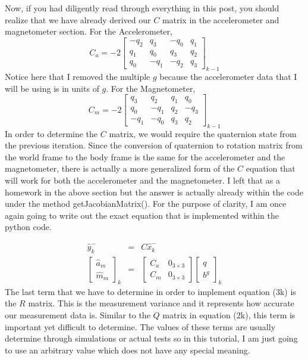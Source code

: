 \documentclass[a4paper,12pt]{book}
\begin{document}
Now, if you had diligently read through everything in this post, you should realize that we have already derived our $C$ matrix in the accelerometer and magnetometer section. For the Accelerometer,
\begin{equation}
    C_a= -2\begin{bmatrix} -q_2 & q_3 & -q_0 & q_1 \\ q_1 & q_0 & q_3 & q_2 \\ q_0 & -q_1 & -q_2 & q_3 \end{bmatrix}_{k-1}
\end{equation}
Notice here that I removed the multiple $g$ because the accelerometer data that I will be using is in units of $g$. For the Magnetometer,
\begin{equation}
    C_m= -2\begin{bmatrix} q_3 & q_2 & q_1 & q_0 \\ q_0 & -q_1 & q_2 & -q_3 \\ -q_1 & -q_0 & q_3 & q_2 \end{bmatrix}_{k-1}
\end{equation}
In order to determine the $C$ matrix, we would require the quaternion state from the previous iteration. Since the conversion of quaternion to rotation matrix from the world frame to the body frame is the same for the accelerometer and the magnetometer, there is actually a more generalized form of the $C$ equation that will work for both the accelerometer and the magnetometer. I left that as a homework in the above section but the answer is actually already within the code under the method getJacobianMatrix(). For the purpose of clarity, I am once again going to write out the exact equation that is implemented within the python code.

\begin{eqnarray}
    \hat{y}^-_k &=& C\hat{x}^-_k \\ 
    \begin{bmatrix} \hat{a}_m \\ \hat{m}_m \end{bmatrix}_k &=& \begin{bmatrix} C_a & 0_{3\times3}  \\ C_m & 0_{3\times3} \end{bmatrix} \begin{bmatrix} q \\ b^g \end{bmatrix}_k 
\end{eqnarray}
The last term that we have to determine in order to implement equation (3k) is the $R$ matrix. This is the measurement variance and it represents how accurate our measurement data is. Similar to the $Q$ matrix in equation (2k), this term is important yet difficult to determine. The values of these terms are usually determine through simulations or actual tests so in this tutorial, I am just going to use an arbitrary value which does not have any special meaning.
\end{document}
